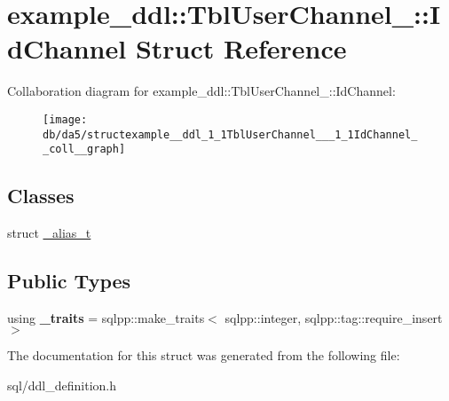 \hypertarget{structexample__ddl_1_1TblUserChannel___1_1IdChannel}{}\section{example\+\_\+ddl\+:\+:Tbl\+User\+Channel\+\_\+\+:\+:Id\+Channel Struct Reference}
\label{structexample__ddl_1_1TblUserChannel___1_1IdChannel}


Collaboration diagram for example\+\_\+ddl\+:\+:Tbl\+User\+Channel\+\_\+\+:\+:Id\+Channel\+:
\nopagebreak
\begin{figure}[H]
\begin{center}
\leavevmode
\texttt{[image: db/da5/structexample\_\_ddl\_1\_1TblUserChannel\_\_\_1\_1IdChannel\_\_coll\_\_graph]}
\end{center}
\end{figure}
\subsection*{Classes}
\begin{DoxyCompactItemize}
\item 
struct \hyperlink{structexample__ddl_1_1TblUserChannel___1_1IdChannel_1_1__alias__t}{\+\_\+alias\+\_\+t}
\end{DoxyCompactItemize}
\subsection*{Public Types}
\begin{DoxyCompactItemize}
\item 
\hypertarget{structexample__ddl_1_1TblUserChannel___1_1IdChannel_a03e071c195c709e397e84d9b3498f4c9}{}using {\bfseries \+\_\+traits} = sqlpp\+::make\+\_\+traits$<$ sqlpp\+::integer, sqlpp\+::tag\+::require\+\_\+insert $>$\label{structexample__ddl_1_1TblUserChannel___1_1IdChannel_a03e071c195c709e397e84d9b3498f4c9}

\end{DoxyCompactItemize}


The documentation for this struct was generated from the following file\+:\begin{DoxyCompactItemize}
\item 
sql/ddl\+\_\+definition.\+h\end{DoxyCompactItemize}
